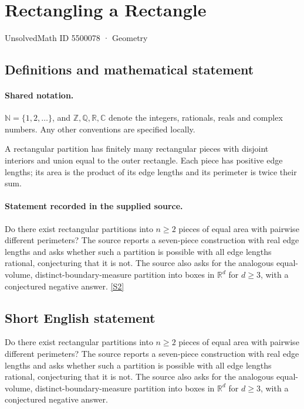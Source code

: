 \documentclass[11pt]{article}
\newcommand{\sref}[2]{\hyperlink{source:#1:#2}{[S#2]}}
\begin{document}
\setcounter{section}{5500077}
\section{Rectangling a Rectangle}\label{5500078}
{\small\sffamily UnsolvedMath ID 5500078 · Geometry}
\subsection{Definitions and mathematical statement}

\paragraph{Shared notation.}$\mathbb N=\{1,2,\ldots\}$, and $\mathbb Z,\mathbb Q,\mathbb R,\mathbb C$ denote the integers, rationals, reals and complex numbers. Any other conventions are specified locally.


A rectangular partition has finitely many rectangular pieces with disjoint interiors and union equal to the outer rectangle. Each piece has positive edge lengths; its area is the product of its edge lengths and its perimeter is twice their sum.
\paragraph{Statement recorded in the supplied source.}
Do there exist rectangular partitions into $n\ge2$ pieces of equal area with pairwise different perimeters? The source reports a seven-piece construction with real edge lengths and asks whether such a partition is possible with all edge lengths rational, conjecturing that it is not. The source also asks for the analogous equal-volume, distinct-boundary-measure partition into boxes in $\mathbb R^d$ for $d\ge3$, with a conjectured negative answer. \sref{5500078}{2}
\subsection{Short English statement}
Do there exist rectangular partitions into $n\ge2$ pieces of equal area with pairwise different perimeters? The source reports a seven-piece construction with real edge lengths and asks whether such a partition is possible with all edge lengths rational, conjecturing that it is not. The source also asks for the analogous equal-volume, distinct-boundary-measure partition into boxes in $\mathbb R^d$ for $d\ge3$, with a conjectured negative answer.
\end{document}
